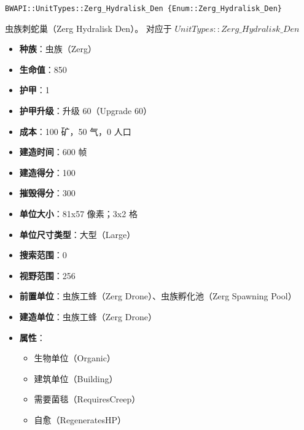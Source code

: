 \begin{tcolorbox}[colback=white, colframe=black!60!white, title=Zerg\_Hydralisk\_Den(), arc=0mm]
    \begin{verbatim}
BWAPI::UnitTypes::Zerg_Hydralisk_Den {Enum::Zerg_Hydralisk_Den}
    \end{verbatim}
    虫族刺蛇巢（Zerg Hydralisk Den）。
    对应于  $UnitTypes::Zerg\_Hydralisk\_Den$ 
    \begin{itemize}
        \item \textbf{种族}：虫族（Zerg）
        \item \textbf{生命值}：850
        \item \textbf{护甲}：1
        \item \textbf{护甲升级}：升级 60（Upgrade 60）
        \item \textbf{成本}：100 矿，50 气，0 人口
        \item \textbf{建造时间}：600 帧
        \item \textbf{建造得分}：100
        \item \textbf{摧毁得分}：300
        \item \textbf{单位大小}：81x57 像素；3x2 格
        \item \textbf{单位尺寸类型}：大型（Large）
        \item \textbf{搜索范围}：0
        \item \textbf{视野范围}：256
        \item \textbf{前置单位}：虫族工蜂（Zerg Drone）、虫族孵化池（Zerg Spawning Pool）
        \item \textbf{建造单位}：虫族工蜂（Zerg Drone）
        \item \textbf{属性}：
            \begin{itemize}
                \item 生物单位（Organic）
                \item 建筑单位（Building）
                \item 需要菌毯（RequiresCreep）
                \item 自愈（RegeneratesHP）
            \end{itemize}
    \end{itemize}
\end{tcolorbox}

